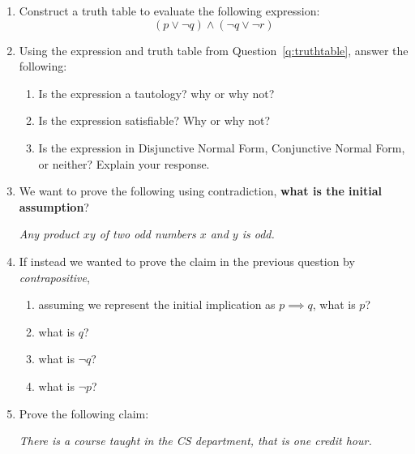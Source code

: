 \documentclass[11pt, oneside]{article}   	%
\begin{document}
\begin{enumerate}
\item \label{q:truthtable} Construct a truth table to evaluate the following expression:
\[
\left(p \vee \neg q\right) \wedge \left(\neg q \vee \neg r\right)
\]
\vspace{18em}

\clearpage
\item Using the expression and truth table from Question~\ref{q:truthtable}, answer the following:
\begin{enumerate}
\item Is the expression a tautology? why or why not? \vspace{3em}
\item Is the expression satisfiable? Why or why not? \vspace{3em}
\item Is the expression in Disjunctive Normal Form, Conjunctive Normal Form, or neither? Explain your response. \vspace{3em}
\end{enumerate}


\item We want to prove the following using contradiction, \textbf{what is the initial assumption}?
\begin{center}
\textit{Any product $xy$ of two odd numbers $x$ and $y$ is odd.}
\end{center}
\vspace{3em}


\item If instead we wanted to prove the claim in the previous question by \textit{contrapositive}, 
\begin{enumerate}
\item assuming we represent the initial implication as $p \implies q$, what is $p$?
\vspace{2em}
\item what is $q$?
\vspace{2em}
\item what is $\neg q$?
\vspace{2em}
\item what is $\neg p$?
\vspace{2em}
\end{enumerate}


\item Prove the following claim: 
\begin{center}
\textit{There is a course taught in the CS department, that is one credit hour. }
\end{center}
\vspace{3em}


\end{enumerate}
\end{document}
